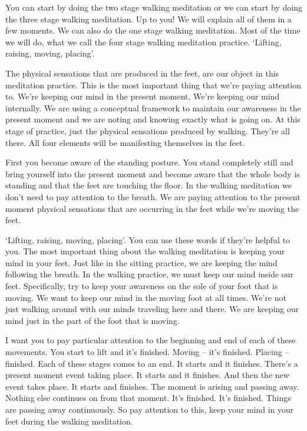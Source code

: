 \documentclass[letterpaper,10pt,english]{sphinxmanual}
\begin{document}
\sphinxAtStartPar
You can start by doing the two stage walking meditation or we can start
by doing the three stage walking meditation. Up to you! We will explain all
of them in a few moments. We can also do the one stage walking meditation.
Most of the time we will do, what we call the four stage walking meditation
practice. ‘Lifting, raising, moving, placing’.

\sphinxAtStartPar
The physical sensations that are produced in the feet, are our object in
this meditation practice. This is the most important thing that we’re paying
attention to. We’re keeping our mind in the present moment. We’re keeping
our mind internally. We are using a conceptual framework to maintain our
awareness  in  the  present  moment  and  we  are  noting  and  knowing  exactly
what is going on. At this stage of practice, just the physical sensations produced by walking. They’re all there. All four elements will be manifesting
themselves in the feet.

\sphinxAtStartPar
First you become aware of the standing posture. You stand completely
  still and bring yourself into the present moment and become aware that the
whole body is standing and that the feet are touching the floor. In the walking meditation we don’t need to pay attention to the breath. We are paying
attention to the present moment physical sensations that are occurring in the
feet while we’re moving the feet.

\sphinxAtStartPar
‘Lifting, raising, moving, placing’. You can use these words if they’re
helpful  to  you. The  most  important  thing  about  the  walking  meditation  is
keeping your mind in your feet. Just like in the sitting practice, we are keeping the mind following the breath. In the walking practice, we must keep our
mind inside our feet. Specifically, try to keep your awareness on the sole of
your foot that is moving. We want to keep our mind in the moving foot at
all times. We’re not just walking around with our minds traveling here and
there. We are keeping our mind just in the part of the foot that is moving.

\sphinxAtStartPar
I want you to pay particular attention to the beginning and end of each
of these movements. You start to lift and it’s finished. Moving – it’s finished.
Placing – finished. Each of these stages comes to an end. It starts and it finishes. There’s a present moment event taking place. It starts and it finishes.
And  then  the  new  event  takes  place.  It  starts  and  finishes. The  moment  is
arising and passing away. Nothing else continues on from that moment. It’s
finished. It’s finished. Things are passing away continuously. So pay attention to this, keep your mind in your feet during the walking meditation.
\end{document}
